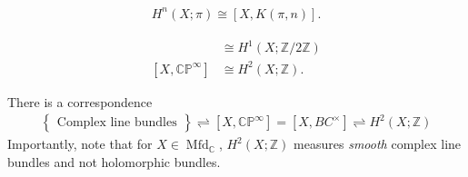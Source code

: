 \begin{theorem}

\begin{align*}
H^n(X; \pi) \cong [X, K( \pi, n) ]
.\end{align*}

\end{theorem}

\begin{example}[?]

\begin{align*}
[X, {\mathbb{RP}}^{\infty } ] &\cong H^1(X; {\mathbb{Z}}/2{\mathbb{Z}}) \\
[X, {\mathbb{CP}}^{\infty } ] &\cong H^2(X; {\mathbb{Z}})
.\end{align*}

\end{example}

\begin{proposition}[?]

There is a correspondence
\begin{align*}
\left\{{\substack{
  \text{Complex line bundles}
}}\right\}
\rightleftharpoons
[X, {\mathbb{CP}}^{\infty }] = [X, BC^{\times}]
\rightleftharpoons
H^2(X; {\mathbb{Z}})
\end{align*}
Importantly, note that for \(X \in {\operatorname{Mfd}}_{\mathbb{C}}\),
\(H^2(X; {\mathbb{Z}})\) measures \emph{smooth} complex line bundles and
not holomorphic bundles.

\end{proposition}

